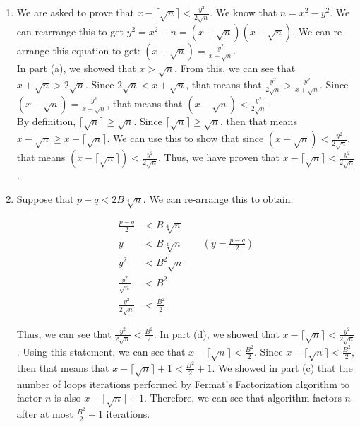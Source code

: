 \documentclass[11pt]{article}
\theoremstyle{definition}
\begin{document}
\begin{enumerate}
\begin{enumerate}
\item  %
We are asked to prove that $x - \lceil \sqrt{n} \rceil < \frac{y^2}{2\sqrt{n}}$. We know that $n = x^2 - y^2$. We can rearrange this to get $y^2 = x^2 - n = (x + \sqrt{n})(x - \sqrt{n})$. We can re-arrange this equation to get: $(x - \sqrt{n}) = \frac{y^2}{x + \sqrt{n}}$. \\

In part (a), we showed that $x > \sqrt{n}$. From this, we can see that $x + \sqrt{n} > 2\sqrt{n}$. Since $2\sqrt{n} < x + \sqrt{n}$, that means that $\frac{y^2}{2\sqrt{n}} > \frac{y^2}{x + \sqrt{n}}$. Since $(x - \sqrt{n}) = \frac{y^2}{x + \sqrt{n}}$, that means that $(x - \sqrt{n}) < \frac{y^2}{2\sqrt{n}}$. \\

By definition, $\lceil \sqrt{n} \rceil \geq \sqrt{n}$. Since $\lceil \sqrt{n} \rceil \geq \sqrt{n}$, then that means $x - \sqrt{n} \geq x - \lceil \sqrt{n} \rceil$. We can use this to show that since $(x - \sqrt{n}) < \frac{y^2}{2\sqrt{n}}$, that means $(x - \lceil \sqrt{n} \rceil) < \frac{y^2}{2\sqrt{n}}$. Thus, we have proven that $x - \lceil \sqrt{n} \rceil < \frac{y^2}{2\sqrt{n}}$.

\item  %
Suppose that $p - q < 2B\sqrt[4]{n}$. We can re-arrange this to obtain:

\begin{align*}
    \frac{p - q}{2} &< B\sqrt[4]{n} \\
    y &< B\sqrt[4]{n} \quad \quad (y = \frac{p - q}{2}) \\
    y^2 &< B^2\sqrt{n} \\
    \frac{y^2}{\sqrt{n}} &< B^2 \\
    \frac{y^2}{2\sqrt{n}} &< \frac{B^2}{2}
\end{align*}

Thus, we can see that $\frac{y^2}{2\sqrt{n}} < \frac{B^2}{2}$. In part (d), we showed that $x - \lceil \sqrt{n} \rceil < \frac{y^2}{2\sqrt{n}}$. Using this statement, we can see that $x - \lceil \sqrt{n} \rceil < \frac{B^2}{2}$. Since $x - \lceil \sqrt{n} \rceil < \frac{B^2}{2}$, then that means that $x - \lceil \sqrt{n} \rceil + 1 < \frac{B^2}{2} + 1$. We showed in part (c) that the number of loops iterations performed by Fermat's Factorization algorithm to factor $n$ is also $x - \lceil \sqrt{n} \rceil + 1$. Therefore, we can see that algorithm factors $n$ after at most $\frac{B^2}{2} + 1$ iterations. 

\end{enumerate}


\end{enumerate}
\end{document}
